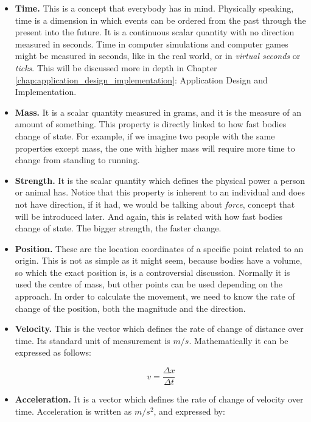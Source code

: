 \begin{itemize}

\item{{\bf Time.} This is a concept that everybody has in mind. Physically speaking, time is a dimension in which events can be ordered from the past through the present into the future. It is a continuous scalar quantity with no direction measured in seconds. Time in computer simulations and computer games might be measured in seconds, like in the real world, or in \emph{virtual seconds} or \emph{ticks}. This will be discussed more in depth in Chapter \ref{chap:application_design_implementation}: Application Design and Implementation.}

\item{{\bf Mass.} It is a scalar quantity measured in grams, and it is the measure of an amount of something. This property is directly linked to how fast bodies change of state. For example, if we imagine two people with the same properties except mass, the one with higher mass will require more time to change from standing to running.}

\item{{\bf Strength.} It is the scalar quantity which defines the physical power a person or animal has. Notice that this property is inherent to an individual and does not have direction, if it had, we would be talking about \emph{force}, concept that will be introduced later. And again, this is related with how fast bodies change of state. The bigger strength, the faster change.}

\item{{\bf Position.} These are the location coordinates of a specific point related to an origin. This is not as simple as it might seem, because bodies have a volume, so which the exact position is, is a controversial discussion. Normally it is used the centre of mass, but other points can be used depending on the approach. In order to calculate the movement, we need to know the rate of change of the position, both the magnitude and the direction.}

\item{{\bf Velocity.} This is the vector which defines the rate of change of distance over time. Its standard unit of measurement is $m/s$. Mathematically it can be expressed as follows:}

\begin{equation}
  v=\frac{\Delta x}{\Delta t}
\end{equation}

\item{{\bf Acceleration.} It is a vector which defines the rate of change of velocity over time. Acceleration is written as $m/s^2$, and expressed by:}


\end{itemize}
